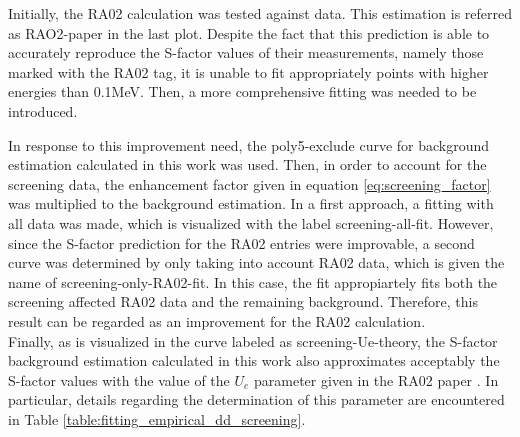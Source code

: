 \documentclass[openany]{book}
\begin{document}

Initially, the RA02 calculation \cite{raiola_migliardi_gyurky_aliotta_formicola_bonetti_broggini_campajola_corvisiero_costantini_et_2002} was tested against data. This estimation is referred as RAO2-paper in the last plot. Despite the fact that this prediction is able to accurately reproduce the S-factor values of their measurements, namely those marked with the RA02 tag, it is unable to fit appropriately points with higher energies than 0.1MeV. Then, a more comprehensive fitting was needed to be introduced. 

In response to this improvement need, the poly5-exclude curve for background estimation calculated in this work was used. Then, in order to account for the screening data, the enhancement factor given in equation \ref{eq:screening_factor} was multiplied to the background estimation. In a first approach, a fitting with all data was made, which is visualized with the label screening-all-fit. However, since the S-factor prediction for the RA02 entries were improvable, a second curve was determined by only taking into account RA02 data, which is given the name of screening-only-RA02-fit. In this case, the fit appropiartely fits both the screening affected RA02 data and the remaining  background. Therefore, this result can be regarded as an improvement for the RA02 calculation. \\

Finally, as is visualized in the curve labeled as screening-Ue-theory, the S-factor background estimation calculated in this work also approximates acceptably the S-factor values with the value of the $U_e$ parameter given in the RA02 paper \cite{raiola_migliardi_gyurky_aliotta_formicola_bonetti_broggini_campajola_corvisiero_costantini_et_2002}. In particular, details regarding the determination of this parameter are encountered in Table \ref{table:fitting_empirical_dd_screening}. \\
\end{document}
